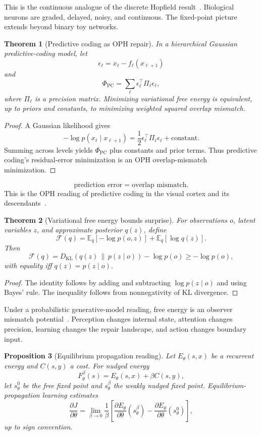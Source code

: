\documentclass[11pt]{article}
\newtheorem{theorem}{Theorem}[section]
\newtheorem{proposition}[theorem]{Proposition}
\theoremstyle{remark}
\theoremstyle{plain}
\newcommand{\E}{\mathbb E}
\begin{document}
This is the continuous analogue of the discrete Hopfield result~\cite{CohenGrossberg1983}. Biological neurons are graded, delayed, noisy, and continuous. The fixed-point picture extends beyond binary toy networks.

\begin{theorem}[Predictive coding as OPH repair]
In a hierarchical Gaussian predictive-coding model, let
\[
\epsilon_\ell=x_\ell-f_\ell(x_{\ell+1})
\]
and
\[
\Phi_{\mathrm{PC}}
=
\sum_\ell \epsilon_\ell^\top\Pi_\ell\epsilon_\ell,
\]
where \(\Pi_\ell\) is a precision matrix. Minimizing variational free energy is equivalent, up to priors and constants, to minimizing weighted squared overlap mismatch.
\end{theorem}

\begin{proof}
A Gaussian likelihood gives
\[
-\log p(x_\ell\mid x_{\ell+1})
=
\frac12\epsilon_\ell^\top\Pi_\ell\epsilon_\ell+\mathrm{constant}.
\]
Summing across levels yields \(\Phi_{\mathrm{PC}}\) plus constants and prior terms. Thus predictive coding's residual-error minimization is an OPH overlap-mismatch minimization.
\end{proof}

\[
\boxed{
\text{prediction error}=\text{overlap mismatch}.
}
\]
This is the OPH reading of predictive coding in the visual cortex and its descendants~\cite{RaoBallard1999}.

\begin{theorem}[Variational free energy bounds surprise]
For observations \(o\), latent variables \(z\), and approximate posterior \(q(z)\), define
\[
\mathcal F(q)=
\E_q[-\log p(o,z)]+\E_q[\log q(z)].
\]
Then
\[
\mathcal F(q)
=
D_{\mathrm{KL}}\!\left(q(z)\,\|\,p(z\mid o)\right)
-\log p(o)
\ge
-\log p(o),
\]
with equality iff \(q(z)=p(z\mid o)\).
\end{theorem}

\begin{proof}
The identity follows by adding and subtracting \(\log p(z\mid o)\) and using Bayes' rule. The inequality follows from nonnegativity of KL divergence.
\end{proof}

Under a probabilistic generative-model reading, free energy is an observer mismatch potential~\cite{Friston2010}. Perception changes internal state, attention changes precision, learning changes the repair landscape, and action changes boundary input.

\begin{proposition}[Equilibrium propagation reading]
Let \(E_\theta(s,x)\) be a recurrent energy and \(C(s,y)\) a cost. For nudged energy
\[
F_\theta^\beta(s)=E_\theta(s,x)+\beta C(s,y),
\]
let \(s_\theta^0\) be the free fixed point and \(s_\theta^\beta\) the weakly nudged fixed point. Equilibrium-propagation learning estimates
\[
\frac{\partial J}{\partial\theta}
=
\lim_{\beta\to0}
\frac1\beta
\left[
\frac{\partial E_\theta}{\partial\theta}(s_\theta^\beta)
-
\frac{\partial E_\theta}{\partial\theta}(s_\theta^0)
\right],
\]
up to sign convention.
\end{proposition}
\end{document}

